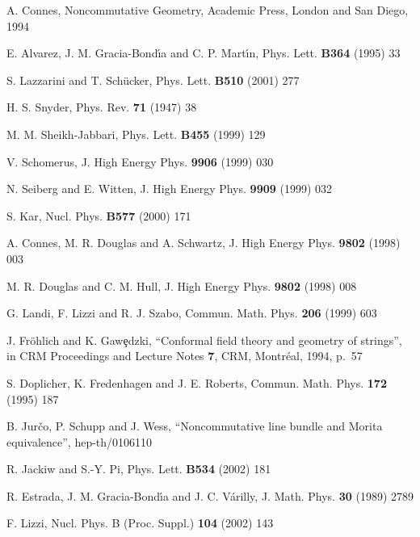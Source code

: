 \documentclass[a4paper,12pt]{article}
\newcommand{\1}{\mathbf{1}}         %
\newcommand{\7}{\dagger}            %
\newcommand{\8}{\bullet}            %
\renewcommand{\.}{\cdot}            %
\renewcommand{\:}{\colon}           %
\begin{document}
\begin{thebibliography}{92}
A. Connes,
Noncommutative Geometry,
Academic Press, London and San Diego, 1994

E. Alvarez, J. M. Gracia-Bond\'{\i}a and C. P. Mart\'{\i}n,
Phys. Lett. {\bf B364} (1995) 33

S. Lazzarini and T. Sch\"ucker,
Phys. Lett. {\bf B510} (2001) 277

H. S. Snyder,
Phys. Rev. {\bf 71} (1947) 38

M. M. Sheikh-Jabbari,
Phys. Lett. {\bf B455} (1999) 129

V. Schomerus,
J. High Energy Phys. {\bf 9906} (1999) 030

N. Seiberg and E. Witten,
J. High Energy Phys. {\bf 9909} (1999) 032

S. Kar,
Nucl. Phys. {\bf B577} (2000) 171

A. Connes, M. R. Douglas and A. Schwartz,
J. High Energy Phys. {\bf 9802} (1998) 003

M. R. Douglas and C. M. Hull,
J. High Energy Phys. {\bf 9802} (1998) 008

G. Landi, F. Lizzi and R. J. Szabo,
Commun. Math. Phys. {\bf 206} (1999) 603

J. Fr\"ohlich and K. Gaw\c{e}dzki,
``Conformal field theory and geometry of strings'',
in CRM Proceedings and Lecture Notes {\bf 7},
CRM, Montr\'eal, 1994, p.~57

S. Doplicher, K. Fredenhagen and J. E. Roberts,
Commun. Math. Phys. {\bf 172} (1995) 187

B. Jur\v{c}o, P. Schupp and J. Wess,
``Noncommutative line bundle and Morita equivalence'',
hep-th/0106110

R. Jackiw and S.-Y. Pi,
Phys. Lett. {\bf B534} (2002) 181

R. Estrada, J. M. Gracia-Bond\'{\i}a and J. C. V\'arilly,
J. Math. Phys. {\bf 30} (1989) 2789

F. Lizzi,
Nucl. Phys. B (Proc. Suppl.) {\bf 104} (2002) 143


\end{thebibliography}
\end{document}

